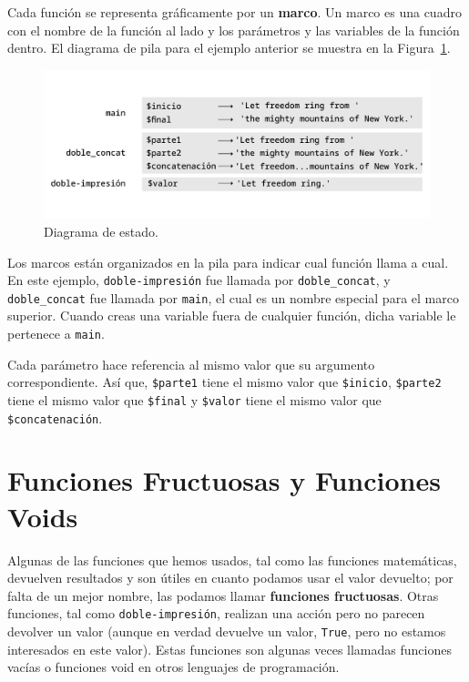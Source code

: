 Cada función se representa gráficamente por un {\bf marco}. Un marco
es una cuadro con el nombre de la función al lado y los parámetros y
las variables de la función dentro. El diagrama de pila 
para el ejemplo anterior se muestra en la Figura~\ref{fig.stack}.

\begin{figure}
\centerline
{\includegraphics[scale=0.8]{figs/stack_diagram.pdf}}
\caption{Diagrama de estado.}
\label{fig.stack}
\end{figure}

Los marcos están organizados en la pila para indicar cual función
llama a cual. En este ejemplo, \verb|doble-impresión| fue llamada
por \verb|doble_concat|, y \verb|doble_concat| fue llamada por 
\verb|main|, el cual es un nombre especial para el marco superior.
Cuando creas una variable fuera de cualquier función, dicha variable
le pertenece a \verb|main|.

Cada parámetro hace referencia al mismo valor que su argumento correspondiente.
Así que, {\tt \$parte1} tiene el mismo valor que {\tt \$inicio},
{\tt \$parte2} tiene el mismo valor que {\tt \$final} y {\tt \$valor}
tiene el mismo valor que {\tt \$concatenación}.



\section{Funciones Fructuosas y Funciones Voids}

Algunas de las funciones que hemos usados, tal como las 
funciones matemáticas, devuelven resultados y son útiles
en cuanto podamos usar el valor devuelto; por falta de un 
mejor nombre, las podamos llamar {\bf funciones fructuosas}.
Otras funciones, tal como \verb|doble-impresión|, realizan una
acción pero no parecen devolver un valor (aunque en verdad devuelve
un valor, {\tt True}, pero no estamos interesados en este valor).
Estas funciones son algunas veces llamadas funciones vacías o funciones
void en otros lenguajes de programación.


